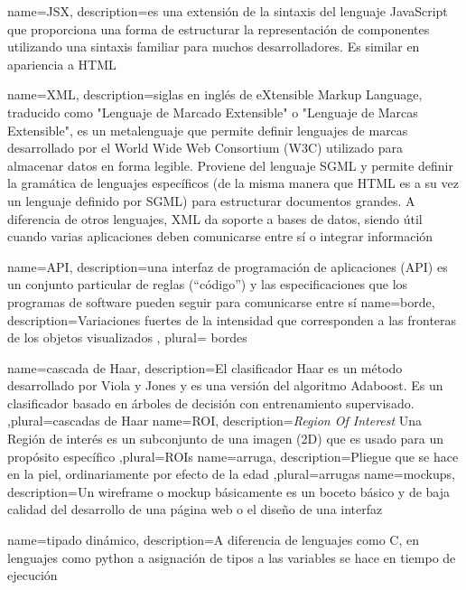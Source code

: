 
{
	name=JSX,
	description={es una extensión de la sintaxis del lenguaje JavaScript que proporciona una forma de estructurar la representación de componentes utilizando una sintaxis familiar para muchos desarrolladores. Es similar en apariencia a HTML} 
}

{
	name=XML,
	description={siglas en inglés de eXtensible Markup Language, traducido como "Lenguaje de Marcado Extensible" o "Lenguaje de Marcas Extensible", es un metalenguaje que permite definir lenguajes de marcas desarrollado por el World Wide Web Consortium (W3C) utilizado para almacenar datos en forma legible. Proviene del lenguaje SGML y permite definir la gramática de lenguajes específicos (de la misma manera que HTML es a su vez un lenguaje definido por SGML) para estructurar documentos grandes. A diferencia de otros lenguajes, XML da soporte a bases de datos, siendo útil cuando varias aplicaciones deben comunicarse entre sí o integrar información} 
}

{
	name=API,
	description={una interfaz de programación de aplicaciones (API) es un conjunto particular de reglas (``código'') y las especificaciones que los programas de software pueden seguir para comunicarse entre sí} 
}
{
	name=borde,
	description={Variaciones fuertes de la intensidad que	corresponden a las fronteras de los objetos visualizados} , plural= bordes
}


{
	name=cascada de Haar,
	description={El clasificador Haar es un método desarrollado por Viola y Jones y es una versión del algoritmo Adaboost. Es un clasificador basado en árboles de decisión con entrenamiento supervisado.} ,plural=cascadas de Haar
}
{
	name=ROI,
	description={\textit{Region Of Interest} Una Región de interés es un subconjunto de una imagen (\gls{2D}) que es usado para un propósito específico} ,plural=ROIs
}
{
	name=arruga,
	description={Pliegue que se hace en la piel, ordinariamente por efecto de la edad} ,plural=arrugas
}
{
	name=mockups,
	description={Un wireframe o mockup básicamente es un boceto básico y de baja calidad del desarrollo de una página web o el diseño de una interfaz} 
}

{
	name=tipado dinámico,
	description={A diferencia de lenguajes como C, en lenguajes como \gls{python} a asignación de tipos a las variables se hace en tiempo de ejecución} 
}



